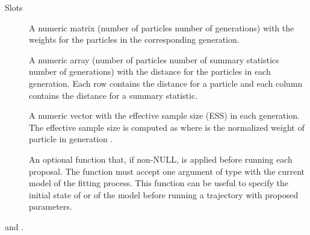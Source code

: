 \documentclass[letterpaper]{book}
\begin{document}
\begin{Section}{Slots}
\begin{description}
\item[] A numeric matrix (number of particles \eqn{\times}{}
number of generations) with the weights for the particles
 in the corresponding generation.

\item[] A numeric array (number of particles \eqn{\times}{}
number of summary statistics \eqn{\times}{} number of
generations) with the distance for the particles  in
each generation. Each row contains the distance for a particle
and each column contains the distance for a summary statistic.

\item[] A numeric vector with the effective sample size (ESS) in
each generation. The effective sample size is computed as
 where  is the
normalized weight of particle  in generation .

\item[] An optional function that, if non-NULL, is
applied before running each proposal. The function must accept
one argument of type  with the current
model of the fitting process. This function can be useful to
specify the initial state of  or  of the
model before running a trajectory with proposed parameters.

\end{description}
\end{Section}
%
\begin{SeeAlso}
 and .
\end{SeeAlso}
%
\end{document}
